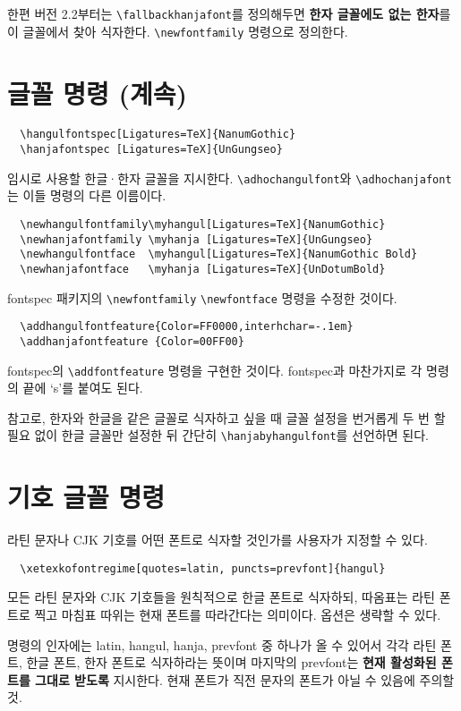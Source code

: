 \documentclass[a4paper]{article}
\def\cs#1{\texttt{\textbackslash #1}}
\def\hemph#1{\textsf{\bfseries #1}}
\begin{document}
한편 버전 2.2부터는 \cs{fallbackhanjafont}를 정의해두면
\hemph{한자 글꼴에도 없는 한자}를
이 글꼴에서 찾아 식자한다. \verb|\newfontfamily| 명령으로 정의한다.

\section{글꼴 명령 (계속)}
\begin{verbatim}
  \hangulfontspec[Ligatures=TeX]{NanumGothic}
  \hanjafontspec [Ligatures=TeX]{UnGungseo}
\end{verbatim}
임시로 사용할 한글·한자 글꼴을 지시한다.
\cs{adhochangulfont}와 \cs{adhochanjafont}는 이들 명령의 다른 이름이다.

\begin{verbatim}
  \newhangulfontfamily\myhangul[Ligatures=TeX]{NanumGothic}
  \newhanjafontfamily \myhanja [Ligatures=TeX]{UnGungseo}
  \newhangulfontface  \myhangul[Ligatures=TeX]{NanumGothic Bold}
  \newhanjafontface   \myhanja [Ligatures=TeX]{UnDotumBold}
\end{verbatim}
fontspec 패키지의 \verb+\newfontfamily+ \verb+\newfontface+ 명령을
수정한 것이다.

\begin{verbatim}
  \addhangulfontfeature{Color=FF0000,interhchar=-.1em}
  \addhanjafontfeature {Color=00FF00}
\end{verbatim}
fontspec의 \verb+\addfontfeature+ 명령을 구현한 것이다.
fontspec과 마찬가지로 각 명령의 끝에 `s'를 붙여도 된다.

참고로, 한자와 한글을 같은 글꼴로 식자하고 싶을 때 글꼴 설정을
번거롭게 두 번 할 필요 없이 한글 글꼴만 설정한 뒤 간단히
  \cs{hanjabyhangulfont}를 선언하면 된다.


\section{기호 글꼴 명령}
라틴 문자나 CJK 기호를 어떤 폰트로 식자할 것인가를 사용자가 지정할 수 있다.
\begin{verbatim}
  \xetexkofontregime[quotes=latin, puncts=prevfont]{hangul}
\end{verbatim}
모든 라틴 문자와 CJK 기호들을 원칙적으로 한글 폰트로 식자하되,
따옴표는 라틴 폰트로 찍고 마침표 따위는 현재 폰트를 따라간다는 의미이다.
옵션은 생략할 수 있다.

명령의 인자에는 latin, hangul, hanja, prevfont 중 하나가 올 수 있어서
각각 라틴 폰트, 한글 폰트, 한자 폰트로 식자하라는 뜻이며
마지막의 prevfont는 \hemph{현재 활성화된 폰트를 그대로 받도록} 지시한다.
현재 폰트가 직전 문자의 폰트가 아닐 수 있음에 주의할 것.
\end{document}
